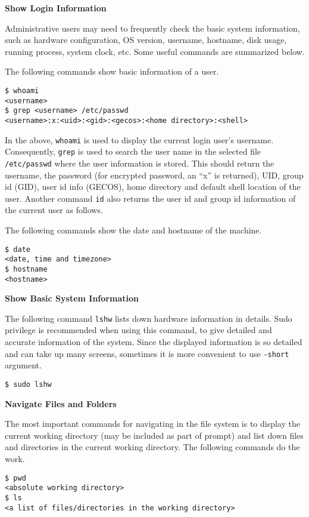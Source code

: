 \vspace{0.1in}
\noindent \textbf{Show Login Information}
\vspace{0.1in}

Administrative users may need to frequently check the basic system information, such as hardware configuration, OS version, username, hostname, disk usage, running process, system clock, etc. Some useful commands are summarized below.

The following commands show basic information of a user.
\begin{verbatim}
$ whoami
<username>
$ grep <username> /etc/passwd
<username>:x:<uid>:<gid>:<gecos>:<home directory>:<shell> 
\end{verbatim}
In the above, \verb|whoami| is used to display the current login user's username. Consequently, \verb|grep| is used to search the user name in the selected file \verb|/etc/passwd| where the user information is stored. This should return the username, the password (for encrypted password, an ``x'' is returned), UID, group id (GID), user id info (GECOS), home directory and default shell location of the user.
Another command \verb|id| also returns the user id and group id information of the current user as follows.

The following commands show the date and hostname of the machine.
\begin{verbatim}
$ date
<date, time and timezone>
$ hostname
<hostname>
\end{verbatim}

\vspace{0.1in}
\noindent \textbf{Show Basic System Information}
\vspace{0.1in}

The following command \verb|lshw| lists down hardware information in details. Sudo privilege is recommended when using this command, to give detailed and accurate information of the system. Since the displayed information is so detailed and can take up many screens, sometimes it is more convenient to use \verb|-short| argument.
\begin{verbatim}
$ sudo lshw
\end{verbatim}



\vspace{0.1in}
\noindent \textbf{Navigate Files and Folders}
\vspace{0.1in}

The most important commands for navigating in the file system is to display the current working directory (may be included as part of prompt) and list down files and directories in the current working directory. The following commands do the work.
\begin{verbatim}
$ pwd
<absolute working directory>
$ ls
<a list of files/directories in the working directory>
\end{verbatim}

